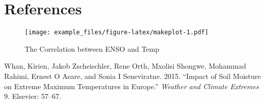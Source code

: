 \documentclass[]{article}
\begin{document}
\section{References}\label{references}

\begin{figure}
\centering
\texttt{[image: example\_files/figure-latex/makeplot-1.pdf]}
\caption{The Correlation between ENSO and Temp}
\end{figure}

\hypertarget{refs}{}
\hypertarget{ref-whan2015impact}{}
Whan, Kirien, Jakob Zscheischler, Rene Orth, Mxolisi Shongwe, Mohammad
Rahimi, Ernest O Asare, and Sonia I Seneviratne. 2015. ``Impact of Soil
Moisture on Extreme Maximum Temperatures in Europe.'' \emph{Weather and
Climate Extremes} 9. Elsevier: 57--67.
\end{document}
